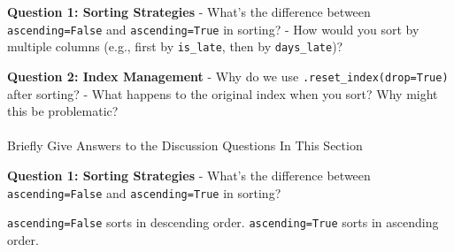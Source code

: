 \documentclass[
]{article}
\makeatletter
\let\oldparagraph\paragraph
\renewcommand{\paragraph}{
    \@ifstar
      \xxxParagraphStar
      \xxxParagraphNoStar
  }
\newcommand{\xxxParagraphStar}[1]{\oldparagraph*{#1}\mbox{}}
\newcommand{\xxxParagraphNoStar}[1]{\oldparagraph{#1}\mbox{}}
\makeatother
\begin{document}
\begin{tcolorbox}[enhanced jigsaw, colbacktitle=quarto-callout-important-color!10!white, toptitle=1mm, colframe=quarto-callout-important-color-frame, bottomtitle=1mm, colback=white, left=2mm, breakable, coltitle=black, bottomrule=.15mm, rightrule=.15mm, titlerule=0mm, opacityback=0, title=\textcolor{quarto-callout-important-color}{\faExclamation}\hspace{0.5em}{🤔 Discussion Questions: Sort Mental Model}, arc=.35mm, opacitybacktitle=0.6, toprule=.15mm, leftrule=.75mm]

\textbf{Question 1: Sorting Strategies} - What's the difference between
\texttt{ascending=False} and \texttt{ascending=True} in sorting? - How
would you sort by multiple columns (e.g., first by \texttt{is\_late},
then by \texttt{days\_late})?

\textbf{Question 2: Index Management} - Why do we use
\texttt{.reset\_index(drop=True)} after sorting? - What happens to the
original index when you sort? Why might this be problematic?

\end{tcolorbox}

\paragraph{Briefly Give Answers to the Discussion Questions In This
Section}\label{briefly-give-answers-to-the-discussion-questions-in-this-section-3}

\textbf{Question 1: Sorting Strategies} - What's the difference between
\texttt{ascending=False} and \texttt{ascending=True} in sorting?

\texttt{ascending=False} sorts in descending order.
\texttt{ascending=True} sorts in ascending order.
\end{document}
